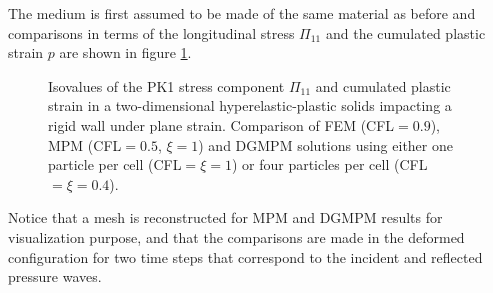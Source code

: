 The medium is first assumed to be made of the same material as before and comparisons in terms of the longitudinal stress $\Pi_{11}$ and the cumulated plastic strain $p$ are shown in figure \ref{fig:PS_taylor}.
\begin{figure}[h!]
  \centering
  \qquad
  \caption{Isovalues of the PK1 stress component $\Pi_{11}$ and cumulated plastic strain in a two-dimensional hyperelastic-plastic solids impacting a rigid wall under plane strain. Comparison of FEM (CFL$=0.9$), MPM (CFL$=0.5$, $\xi=1$) and DGMPM solutions using either one particle per cell (CFL$=\xi=1$) or four particles per cell (CFL$=\xi=0.4$).}
  \label{fig:PS_taylor}
\end{figure}
Notice that a mesh is reconstructed for MPM and DGMPM results for visualization purpose, and that the comparisons are made in the deformed configuration for two time steps that correspond to the incident and reflected pressure waves.

